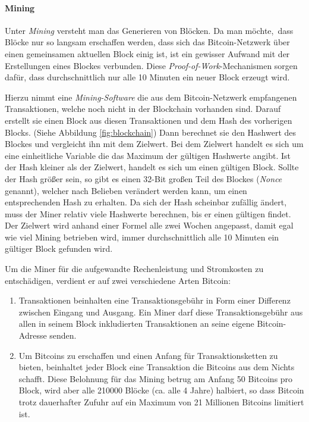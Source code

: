 \paragraph{Mining}
\label{subsec:mining}

Unter \emph{Mining} versteht man das Generieren von Blöcken.
Da man möchte, dass Blöcke nur so langsam erschaffen werden, dass sich das Bitcoin-Netzwerk über einen gemeinsamen aktuellen Block einig ist, ist ein gewisser Aufwand mit der Erstellungen eines Blockes verbunden.
Diese \emph{Proof-of-Work}-Mechanismen sorgen dafür, dass durchschnittlich nur alle 10 Minuten ein neuer Block erzeugt wird.

Hierzu nimmt eine \emph{Mining-Software} die aus dem Bitcoin-Netzwerk empfangenen Transaktionen, welche noch nicht in der Blockchain vorhanden sind.
Darauf erstellt sie einen Block aus diesen Transaktionen und dem Hash des vorherigen Blocks.
(Siehe Abbildung \ref{fig:blockchain})
Dann berechnet sie den Hashwert des Blockes und vergleicht ihn mit dem Zielwert.
Bei dem Zielwert handelt es sich um eine einheitliche Variable die das Maximum der gültigen Hashwerte angibt.
Ist der Hash kleiner als der Zielwert, handelt es sich um einen gültigen Block.
Sollte der Hash größer sein, so gibt es einen 32-Bit großen Teil des Blockes (\emph{Nonce} genannt), welcher nach Belieben verändert werden kann, um einen entsprechenden Hash zu erhalten.
Da sich der Hash scheinbar zufällig ändert, muss der Miner relativ viele Hashwerte berechnen, bis er einen gültigen findet.
Der Zielwert wird anhand einer Formel alle zwei Wochen angepasst, damit egal wie viel Mining betrieben wird, immer durchschnittlich alle 10 Minuten ein gültiger Block gefunden wird.

Um die Miner für die aufgewandte Rechenleistung und Stromkosten zu entschädigen, verdient er auf zwei verschiedene Arten Bitcoin:
\begin{enumerate}
    \item Transaktionen beinhalten eine Transaktionsgebühr in Form einer Differenz zwischen Eingang und Ausgang.
    Ein Miner darf diese Transaktionsgebühr aus allen in seinem Block inkludierten Transaktionen an seine eigene Bitcoin-Adresse senden.
    \item Um Bitcoins zu erschaffen und einen Anfang für Transaktionsketten zu bieten, beinhaltet jeder Block eine Transaktion die Bitcoins aus dem Nichts schafft.
    Diese Belohnung für das Mining betrug am Anfang 50 Bitcoins pro Block, wird aber alle 210000 Blöcke (ca. alle 4 Jahre) halbiert, so dass Bitcoin trotz dauerhafter Zufuhr auf ein Maximum von 21 Millionen Bitcoins limitiert ist.
\end{enumerate}

